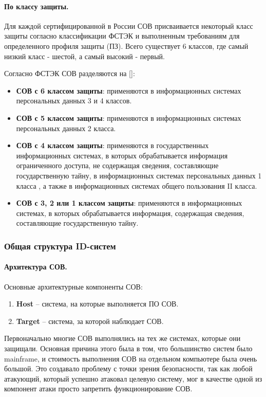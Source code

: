 \paragraph*{По классу защиты.}

Для каждой сертифицированной в России СОВ присваивается некоторый класс защиты 
согласно классификации ФСТЭК и выполненным требованиям для определенного профиля защиты (ПЗ).
Всего существует 6 классов, где самый низкий класс - шестой, а самый высокий - первый.

Согласно ФСТЭК СОВ разделяются на [\cite{IDSFSTEK}]:
\begin{itemize}
	\item \textbf{СОВ с 6 классом защиты}: применяются в информационных системах персональных данных 3 и 4 классов.
	\item \textbf{СОВ с 5 классом защиты}: применяются в информационных системах персональных данных 2 класса.
	\item \textbf{СОВ с 4 классом защиты}: применяются в государственных информационных системах, 
	в которых обрабатывается информация ограниченного доступа, не содержащая сведения, 
	составляющие государственную тайну, в информационных системах персональных данных 1 класса , 
	а также в информационных системах общего пользования II класса.
	\item \textbf{СОВ с 3, 2 или 1 классом защиты}: применяются в информационных системах, 
	в которых обрабатывается информация, содержащая сведения, составляющие государственную тайну.
\end{itemize}


\subsubsection{Общая структура ID-систем} 

\paragraph*{Архитектура СОВ.} Основные архитектурные компоненты СОВ: 
\begin{enumerate}
	\item \textbf{Host} -- система, на которые выполняется ПО СОВ.
	\item \textbf{Target} -- система, за которой наблюдает СОВ.
\end{enumerate}

Первоначально многие СОВ выполнялись на тех же системах, которые они защищали. 
Основная причина этого была в том, что большинство систем было mainframe, и стоимость выполнения СОВ 
на отдельном компьютере была очень большой. Это создавало проблему с точки зрения безопасности, так как 
любой атакующий, который успешно атаковал целевую систему, мог в качестве одной из компонент атаки просто 
запретить функционирование СОВ.

